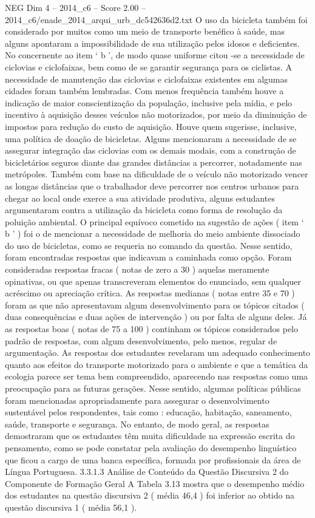 \begin{textsample}{NEG Dim 4 – 2014\_c6 – Score 2.00 – 2014\_c6/enade\_2014\_arqui\_urb\_dc542636d2.txt}
O uso da bicicleta também foi considerado por muitos como um meio de transporte benéfico à saúde, mas alguns apontaram a impossibilidade de sua utilização pelos idosos e deficientes.
No concernente ao item ‘ b ’, de modo quase uniforme citou -se a necessidade de ciclovias e ciclofaixas, bem como de se garantir segurança para os ciclistas.
A necessidade de manutenção das ciclovias e ciclofaixas existentes em algumas cidades foram também lembradas.
Com menos frequência também houve a indicação de maior conscientização da população, inclusive pela mídia, e pelo incentivo à aquisição desses veículos não motorizados, por meio da diminuição de impostos para redução do custo de aquisição.
Houve quem sugerisse, inclusive, uma política de doação de bicicletas.
Alguns mencionaram a necessidade de se assegurar integração das ciclovias com os demais modais, com a construção de bicicletários seguros diante das grandes distâncias a percorrer, notadamente nas metrópoles.
Também com base na dificuldade de o veículo não motorizado vencer as longas distâncias que o trabalhador deve percorrer nos centros urbanos para chegar ao local onde exerce a sua atividade produtiva, alguns estudantes argumentaram contra a utilização da bicicleta como forma de resolução da poluição ambiental.
O principal equívoco cometido na sugestão de ações ( item ‘ b ’ ) foi o de mencionar a necessidade de melhoria do meio ambiente dissociado do uso de bicicletas, como se requeria no comando da questão.
Nesse sentido, foram encontradas respostas que indicavam a caminhada como opção.
Foram consideradas respostas fracas ( notas de zero a 30 ) aquelas meramente opinativas, ou que apenas transcreveram elementos do enunciado, sem qualquer acréscimo ou apreciação crítica.
As respostas medianas ( notas entre 35 e 70 ) foram as que não apresentavam algum desenvolvimento para os tópicos citados ( duas consequências e duas ações de intervenção ) ou por falta de alguns deles.
Já as respostas boas ( notas de 75 a 100 ) continham os tópicos considerados pelo padrão de respostas, com algum desenvolvimento, pelo menos, regular de argumentação.
As respostas dos estudantes revelaram um adequado conhecimento quanto aos efeitos do transporte motorizado para o ambiente e que a temática da ecologia parece ser tema bem compreendido, aparecendo nas respostas como uma preocupação para as futuras gerações.
Nesse sentido, algumas políticas públicas foram mencionadas apropriadamente para assegurar o desenvolvimento sustentável pelos respondentes, tais como : educação, habitação, saneamento, saúde, transporte e segurança.
No entanto, de modo geral, as respostas demostraram que os estudantes têm muita dificuldade na expressão escrita do pensamento, como se pode constatar pela avaliação do desempenho linguístico que ficou a cargo de uma banca específica, formada por profissionais da área de Língua Portuguesa. 3.3.1.3 Análise de Conteúdo da Questão Discursiva 2 do Componente de Formação Geral A Tabela 3.13 mostra que o desempenho médio dos estudantes na questão discursiva 2 ( média 46,4 ) foi inferior ao obtido na questão discursiva 1 ( média 56,1 ).

\end{textsample}
